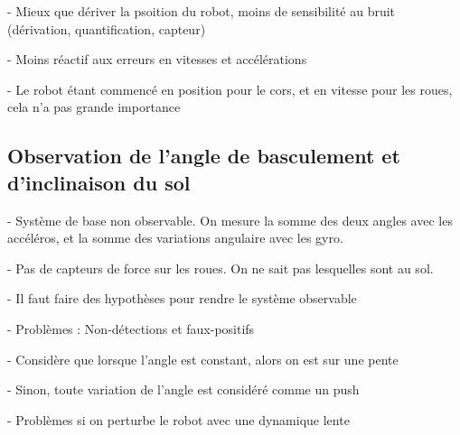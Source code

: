 			- Mieux que dériver la psoition du robot, moins de sensibilité au bruit (dérivation, quantification, capteur)

			- Moins réactif aux erreurs en vitesses et accélérations

			- Le robot étant commencé en position pour le cors, et en vitesse pour les roues, cela n'a pas grande importance

		\subsection{Observation de l'angle de basculement et d'inclinaison du sol}
			
			- Système de base non observable. On mesure la somme des deux angles avec les accéléros, et la somme des variations angulaire avec les gyro.

			- Pas de capteurs de force sur les roues. On ne sait pas lesquelles sont au sol.

			- Il faut faire des hypothèses pour rendre le système observable

			- Problèmes : Non-détections et faux-positifs

			- Considère que lorsque l'angle est constant, alors on est sur une pente

			- Sinon, toute variation de l'angle est considéré comme un push

			- Problèmes si on perturbe le robot avec une dynamique lente

			